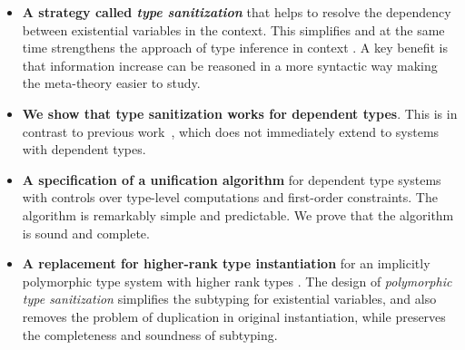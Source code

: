 \begin{itemize}
\item \textbf{A strategy called \textit{type sanitization}} that helps
  to resolve
  the dependency between existential variables in the context. This simplifies
  and at the same time strengthens the approach of type inference in context
  \citep{gundry2010type}. A key benefit is that information increase can be reasoned in a more
  syntactic way making the meta-theory easier to study. 
\item \textbf{We show that type sanitization works for dependent types}. This is
  in contrast to previous work~\citep{gundry2010type, dunfield2013complete, dunfield16gadts}, which does not immediately extend to systems with
  dependent types.~
\item \textbf{A specification of a unification algorithm} for dependent type
  systems with controls over type-level computations and first-order
  constraints. The algorithm is remarkably simple and predictable. We prove that
  the algorithm is sound and complete.
\item \textbf{A replacement for higher-rank type instantiation} for an
  implicitly polymorphic type system with higher rank types
  \citep{dunfield2013complete}. The design of \textit{polymorphic type
    sanitization} simplifies the subtyping for existential variables, and also
  removes the problem of duplication in original instantiation, while preserves
  the completeness and soundness of subtyping.
\end{itemize}

